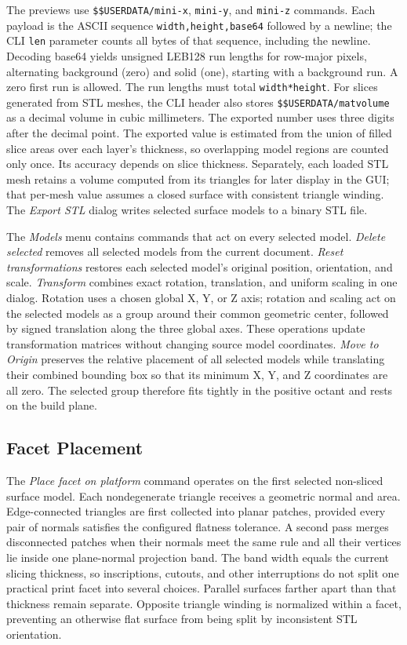 The previews use \texttt{\$\$USERDATA/mini-x}, \texttt{mini-y}, and
\texttt{mini-z} commands. Each payload is the ASCII sequence
\texttt{width,height,base64} followed by a newline; the CLI \texttt{len}
parameter counts all bytes of that sequence, including the newline. Decoding
base64 yields unsigned LEB128 run lengths for row-major pixels, alternating
background (zero) and solid (one), starting with a background run. A zero
first run is allowed. The run lengths must total \texttt{width*height}.
For slices generated from STL meshes, the CLI header also stores
\texttt{\$\$USERDATA/matvolume} as a decimal volume in cubic millimeters.
The exported number uses three digits after the decimal point.
The exported value is estimated from the union of filled slice areas over
each layer's thickness, so overlapping model regions are counted only once.
Its accuracy depends on slice thickness. Separately, each loaded STL mesh
retains a volume computed from its triangles for later display in the GUI;
that per-mesh value assumes a closed surface with consistent triangle winding.
\hypertarget{export-stl-dialog}{}The \emph{Export STL} dialog writes selected
surface models to a binary STL file.

The \emph{Models} menu contains commands that act on every selected model.
\emph{Delete selected} removes all selected models from the current document.
\emph{Reset transformations} restores each selected model's original position,
orientation, and scale. \emph{Transform} combines exact rotation, translation,
and uniform scaling in one dialog. Rotation uses a chosen global X, Y, or Z
axis; rotation and scaling act on the selected models as a group around their
common geometric center, followed by signed translation along the three global
axes. These operations update transformation matrices without changing source
model coordinates. \emph{Move to Origin} preserves the relative placement of
all selected models while translating their combined bounding box so that its
minimum X, Y, and Z coordinates are all zero. The selected group therefore
fits tightly in the positive octant and rests on the build plane.

\subsection{Facet Placement}

The \emph{Place facet on platform} command operates on the first selected
non-sliced surface model. Each nondegenerate triangle receives a geometric
normal and area. Edge-connected triangles are first collected into planar
patches, provided every pair of normals satisfies the configured flatness
tolerance. A second pass merges disconnected patches when their normals meet
the same rule and all their vertices lie inside one plane-normal projection
band. The band width equals the current slicing thickness, so inscriptions,
cutouts, and other interruptions do not split one practical print facet into
several choices. Parallel surfaces farther apart than that thickness remain
separate. Opposite triangle winding is normalized within a facet, preventing
an otherwise flat surface from being split by inconsistent STL orientation.

